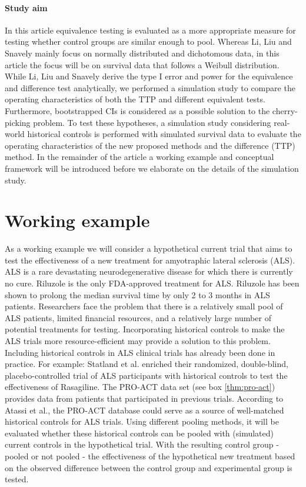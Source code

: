 \documentclass[Royal,sagev,times]{sagej}
\begin{document}
\paragraph{Study aim}
In this article equivalence testing is evaluated as a more appropriate measure for testing whether control groups are similar enough to pool. Whereas Li, Liu and Snavely\cite{li2020} mainly focus on normally distributed and dichotomous data, in this article the focus will be on survival data that follows a Weibull distribution. While Li, Liu and Snavely\cite{li2020} derive the type I error and power for the equivalence and difference test analytically, we performed a simulation study to compare the operating characteristics of both the TTP and different equivalent tests. Furthermore, bootstrapped CIs is considered as a possible solution to the cherry-picking problem. To test these hypotheses, a simulation study considering real-world historical controls is performed with simulated survival data to evaluate the operating characteristics of the new proposed methods and the difference (TTP) method. In the remainder of the article a working example and conceptual framework will be introduced before we elaborate on the details of the simulation study.

\section{Working example}
As a working example we will consider a hypothetical current trial that aims to test the effectiveness of a new treatment for amyotraphic lateral sclerosis (ALS). ALS is a rare devastating neurodegenerative disease for which there is currently no cure.\cite{han2017} Riluzole is the only FDA-approved treatment for ALS.\cite{han2017} Riluzole has been shown to prolong the median survival time by only 2 to 3 months in ALS patients.\cite{han2017} Researchers face the problem that there is a relatively small pool of ALS patients, limited financial resources, and a relatively large number of potential treatments for testing.\cite{simmons2009} Incorporating historical controls to make the ALS trials more resource-efficient may provide a solution to this problem.\cite{donofrio2011} Including historical controls in ALS clinical trials has already been done in practice. For example: Statland et al. enriched their randomized, double-blind, placebo-controlled trial of ALS participants with historical controls to test the effectiveness of Rasagiline.\cite{statland2019} The PRO-ACT data set (see box \ref{thm:pro-act}) provides data from patients that participated in previous trials. 
According to Atassi et al., the PRO-ACT database could serve as a source of well-matched historical controls for ALS trials.\cite{atassi2014} Using different pooling methods, it will be evaluated whether these historical controls can be pooled with (simulated) current controls in the hypothetical trial. With the resulting control group - pooled or not pooled - the effectiveness of the hypothetical new treatment based on the observed difference between the control group and experimental group is tested.
\end{document}
